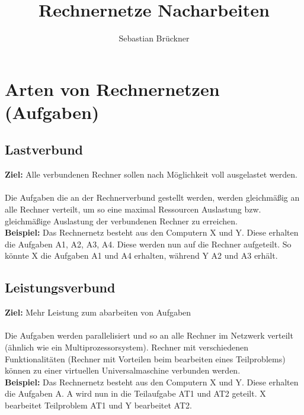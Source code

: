 \documentclass[12pt,a4paper,oneside,german]{article}
\title{Rechnernetze Nacharbeiten}
\author{Sebastian Brückner}
\begin{document}
\maketitle

\begin{versionhistory}
\end{versionhistory}

\newpage
\tableofcontents
\section{Arten von Rechnernetzen (Aufgaben)}	
	\subsection{Lastverbund}
		\textbf{Ziel:} Alle verbundenen Rechner sollen nach Möglichkeit voll ausgelastet werden. \\\\
		Die Aufgaben die an der Rechnerverbund gestellt werden, 
		werden gleichmäßig an alle Rechner verteilt, 
		um so eine maximal Ressourcen Auslastung bzw. gleichmäßige Auslastung der verbundenen Rechner zu erreichen. \cite{Lastv} \\
		\textbf{Beispiel:} Das Rechnernetz besteht aus den Computern X und Y. Diese erhalten die Aufgaben A1, A2, A3, A4.
		Diese werden nun auf die Rechner aufgeteilt. So könnte X die Aufgaben A1 und A4 erhalten, während Y A2 und A3 erhält.

	\subsection{Leistungsverbund}
		\textbf{Ziel:} Mehr Leistung zum abarbeiten von Aufgaben \\\\
		Die Aufgaben werden parallelisiert und so an alle Rechner im Netzwerk verteilt (ähnlich wie ein Multiprozessorsystem).
		Rechner mit verschiedenen Funktionalitäten (Rechner mit Vorteilen beim bearbeiten eines Teilproblems) können zu einer virtuellen Universalmaschine verbunden werden. \cite{Leistungsv}\\
		\textbf{Beispiel:} Das Rechnernetz besteht aus den Computern X und Y. Diese erhalten die Aufgaben A.
		A wird nun in die Teilaufgabe AT1 und AT2 geteilt. X bearbeitet Teilproblem AT1 und Y bearbeitet AT2.
\end{document}
